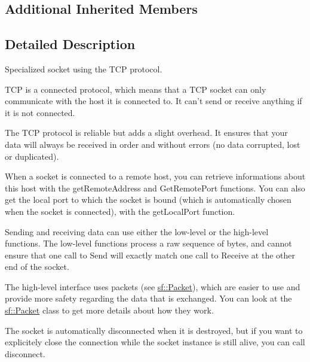 \subsection*{Additional Inherited Members}


\subsection{Detailed Description}
Specialized socket using the T\-C\-P protocol. 

T\-C\-P is a connected protocol, which means that a T\-C\-P socket can only communicate with the host it is connected to. It can't send or receive anything if it is not connected.

The T\-C\-P protocol is reliable but adds a slight overhead. It ensures that your data will always be received in order and without errors (no data corrupted, lost or duplicated).

When a socket is connected to a remote host, you can retrieve informations about this host with the get\-Remote\-Address and Get\-Remote\-Port functions. You can also get the local port to which the socket is bound (which is automatically chosen when the socket is connected), with the get\-Local\-Port function.

Sending and receiving data can use either the low-\/level or the high-\/level functions. The low-\/level functions process a raw sequence of bytes, and cannot ensure that one call to Send will exactly match one call to Receive at the other end of the socket.

The high-\/level interface uses packets (see \hyperlink{classsf_1_1_packet}{sf\-::\-Packet}), which are easier to use and provide more safety regarding the data that is exchanged. You can look at the \hyperlink{classsf_1_1_packet}{sf\-::\-Packet} class to get more details about how they work.

The socket is automatically disconnected when it is destroyed, but if you want to explicitely close the connection while the socket instance is still alive, you can call disconnect.

